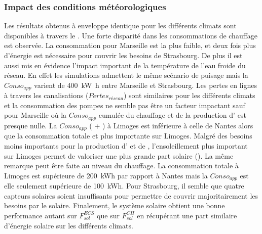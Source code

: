 \subsubsection{Impact des conditions météorologiques} %
\label{ssub:impact_des_conditions_meteorologiques}
Les résultats obtenus à enveloppe identique pour les différents climats sont disponibles à
travers le . Une forte disparité dans les consommations
de chauffage est observée. La consommation pour Marseille est la plus faible, et deux fois
plus d’énergie est nécessaire pour couvrir les besoins de Strasbourg. De plus il est aussi
mis en évidence l’impact important de la température de l’eau froide du réseau. En effet
les simulations admettent le même scénario de puisage mais la $Conso_{app}$ varient de
\SI{400}{\kilo\watt\hour} entre Marseille et Strasbourg. Les pertes en lignes à travers
les canalisations ($Pertes_{réseau}$) sont similaires pour les différents climats et la
consommation des pompes ne semble pas être un facteur impactant sauf pour Marseille où la
$Conso_{app}$ cumulée du chauffage et de la production d’ est presque nulle.
La $Conso_{app}$ ( + ) à Limoges est inférieure à celle de Nantes alors
que la consommation totale et plus importante sur Limoges. Malgré des besoins moins
importants pour la production d’ et de , l’ensoleillement plus important
sur Limoges permet de valoriser une plus grande part solaire
(). La même remarque peut être faite au niveau du
chauffage. La consommation totale à Limoges est supérieure de \SI{200}{kWh} par rapport à
Nantes mais la $Conso_{app}$ est elle seulement supérieure de \SI{100}{kWh}. Pour
Strasbourg, il semble que quatre capteurs solaires soient insuffisants pour permettre
de couvrir majoritairement les besoins par le solaire. Finalement, le système solaire obtient une bonne
performance autant sur $F_{sol}^{ECS}$ que sur $F_{sol}^{CH}$ en récupérant une part
similaire d’énergie solaire sur les différents climats.

